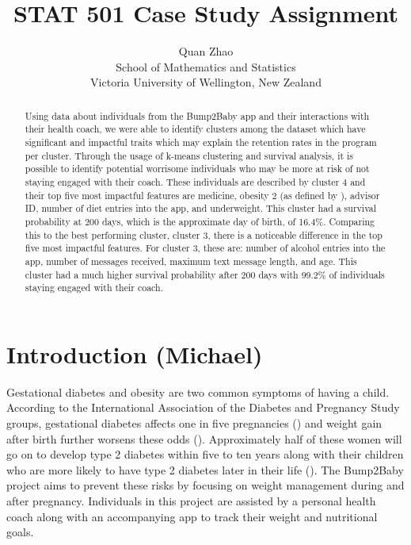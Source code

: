 \documentclass[12pt]{article}
\title{STAT 501 Case Study Assignment}
\author{Quan Zhao\\
School of Mathematics and Statistics\\ Victoria University of Wellington, New Zealand}
\begin{document}
\maketitle

\begin{abstract}
  Using data about individuals from the Bump2Baby app and their interactions with their health coach, we were able to identify clusters among the dataset which have significant and impactful traits which may explain the retention rates in the program per cluster. Through the usage of k-means clustering and survival analysis, it is possible to identify potential worrisome individuals who may be more at risk of not staying engaged with their coach. These individuals are described by cluster 4 and their top five most impactful features are medicine, obesity 2 (as defined by \cite{WHO_BMI}), advisor ID, number of diet entries into the app, and underweight. This cluster had a survival probability at 200 days, which is the approximate day of birth, of 16.4\%. Comparing this to the best performing cluster, cluster 3, there is a noticeable difference in the top five most impactful features. For cluster 3, these are: number of alcohol entries into the app, number of messages received, maximum text message length, and age. This cluster had a much higher survival probability after 200 days with 99.2\% of individuals staying engaged with their coach.
\end{abstract}


\tableofcontents


\setlength{\baselineskip}{0.25in} %





\newpage  %
\section{Introduction (Michael)}
		
		\label{s.intro}
		
		Gestational diabetes and obesity are two common symptoms of having a child. According to the International Association of the Diabetes and Pregnancy Study groups, gestational diabetes affects one in five pregnancies (\cite{10.2337/dc11-1641}) and weight gain after birth further worsens these odds (\cite{nu11040922}). Approximately half of these women will go on to develop type 2 diabetes within five to ten years along with their children who are more likely to have type 2 diabetes later in their life (\cite{Vounzoulakim1361}). The Bump2Baby project aims to prevent these risks by focusing on weight management during and after pregnancy. Individuals in this project are assisted by a personal health coach along with an accompanying app to track their weight and nutritional goals.
		
\end{document}
